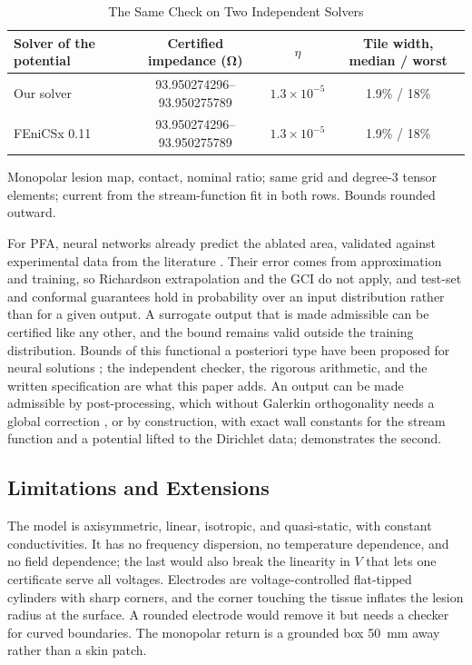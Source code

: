 \documentclass[11pt]{article}
\begin{document}
\begin{table}[t]
\centering
\caption{The Same Check on Two Independent Solvers}\label{tab:fenics}
\small
\begin{tabular}{lccc}
\toprule
Solver of the potential & Certified impedance (\si{\ohm}) & $\eta$ & Tile width, median / worst\\
\midrule
Our solver & 93.950274296--93.950275789 & $1.3\times10^{-5}$ & 1.9\% / 18\%\\
FEniCSx 0.11 & 93.950274296--93.950275789 & $1.3\times10^{-5}$ & 1.9\% / 18\%\\
\bottomrule
\end{tabular}
\par\vspace{2pt}\footnotesize\raggedright Monopolar lesion map, contact, nominal ratio; same grid and degree-3 tensor elements; current from the stream-function fit in both rows. Bounds rounded outward.
\end{table}

For PFA, neural networks already predict the ablated area, validated
against experimental data from the literature \cite{crusi2025}. Their error
comes from approximation and training, so Richardson extrapolation and the GCI
do not apply, and test-set and conformal guarantees hold in probability over an
input distribution rather than for a given output. A surrogate output that is
made admissible can be certified like any other, and the bound remains valid
outside the training distribution. Bounds of this functional a posteriori type
have been proposed for neural solutions \cite{fanaskov2024}; the independent
checker, the rigorous arithmetic, and the written specification are what this
paper adds. An output can be made admissible by post-processing, which without
Galerkin orthogonality needs a global correction \cite{papez2018}, or by
construction, with exact wall constants for the stream function and a potential
lifted to the Dirichlet data; \cite{dovelos2026b} demonstrates the second.

\subsection{Limitations and Extensions} The model is axisymmetric, linear,
isotropic, and quasi-static, with constant conductivities. It has no frequency
dispersion, no temperature dependence, and no field dependence; the last would
also break the linearity in $V$ that lets one certificate serve all voltages.
Electrodes are voltage-controlled flat-tipped cylinders with sharp corners, and
the corner touching the tissue inflates the lesion radius at the surface. A
rounded electrode would remove it but needs a checker for curved boundaries. The
monopolar return is a grounded box \SI{50}{mm} away rather than a skin patch.
\end{document}
